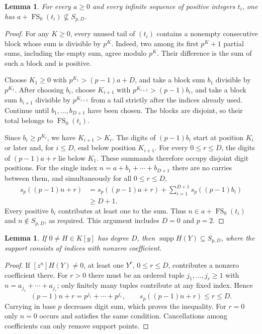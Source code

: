 \documentclass[11pt]{article}
\newtheorem{lemma}[theorem]{Lemma}
\theoremstyle{remark}
\DeclareMathOperator{\FS}{FS}
\DeclareMathOperator{\supp}{supp}
\begin{document}
\begin{lemma}\label{lem:digits}
For every $a\geq0$ and every infinite sequence of positive integers $t_i$,
one has $a+\FS_0(t_i)\not\subseteq S_{p,D}$.
\end{lemma}
\begin{proof}
For any $K\geq0$, every unused tail of $(t_i)$ contains a nonempty
consecutive block whose sum is divisible by $p^K$. Indeed, two among its
first $p^K+1$ partial sums, including the empty sum, agree modulo $p^K$.
Their difference is the sum of such a block and is positive.

Choose $K_1\geq0$ with $p^{K_1}>(p-1)a+D$, and take a block sum $b_1$
divisible by $p^{K_1}$. After choosing $b_i$, choose $K_{i+1}$ with
$p^{K_{i+1}}>(p-1)b_i$, and take a block sum $b_{i+1}$ divisible by
$p^{K_{i+1}}$ from a tail strictly after the indices already used.
Continue until $b_1,\ldots,b_{D+1}$ have been chosen. The blocks are
disjoint, so their total belongs to $\FS_0(t_i)$.

Since $b_i\geq p^{K_i}$, we have $K_{i+1}>K_i$.
The digits of $(p-1)b_i$ start at position $K_i$ or later and, for
$i\leq D$, end below position $K_{i+1}$. For every $0\leq r\leq D$,
the digits of $(p-1)a+r$ lie below $K_1$.
These summands therefore occupy disjoint digit positions. For the single
index $n=a+b_1+\cdots+b_{D+1}$ there are no carries between them, and
simultaneously for all $0\leq r\leq D$,
\begin{align*}
 s_p((p-1)n+r)
 &=s_p((p-1)a+r)+\sum_{i=1}^{D+1}s_p((p-1)b_i)\\
 &\geq D+1.
\end{align*}
Every positive $b_i$ contributes at least one to the sum.
Thus $n\in a+\FS_0(t_i)$ and $n\notin S_{p,D}$, as required.
This argument includes $D=0$ and $p=2$.
\end{proof}

\begin{lemma}\label{lem:support}
If $0\ne H\in K[y]$ has degree $D$, then
$\supp H(Y)\subseteq S_{p,D}$, where the support consists of indices
with nonzero coefficient.
\end{lemma}
\begin{proof}
If $[z^n]H(Y)\ne0$, at least one $Y^r$, $0\leq r\leq D$, contributes
a nonzero coefficient there. For $r>0$ there must be an ordered tuple
$j_1,\ldots,j_r\geq1$ with $n=a_{j_1}+\cdots+a_{j_r}$; only finitely
many tuples contribute at any fixed index. Hence
\[
 (p-1)n+r=p^{j_1}+\cdots+p^{j_r},\qquad
 s_p((p-1)n+r)\leq r\leq D.
\]
Carrying in base $p$ decreases digit sum, which proves the inequality.
For $r=0$ only $n=0$ occurs and satisfies the same condition.
Cancellations among coefficients can only remove support points.
\end{proof}
\end{document}

